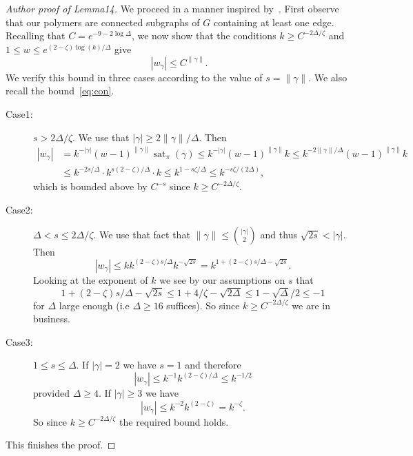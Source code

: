 \documentclass[10pt,a4paper]{article}
\theoremstyle{definition}
\DeclareMathOperator{\sat}{sat}
\begin{document}
\begin{proof}[Author proof of Lemma14]
We proceed in a manner inspired by~\cite[Theorem2.4]{BCHPT19}. First observe that our polymers are connected subgraphs of $G$ containing at least one edge. Recalling that $C=e^{-9-2\log\Delta}$, we now show that the conditions $k\geq C^{-2\Delta/\zeta}$ and $1\leq w\leq e^{(2-\zeta)\log(k)/\Delta}$ give
\begin{equation}|w_\gamma|\leq C^{\|\gamma\|}.\label{eq:weight bound}\end{equation}
We verify this bound in three cases according to the value of $s=\|\gamma\|$. We also recall the bound~\eqref{eq:con}.
\begin{description}
\item[Case1:] $s>2\Delta/\zeta$. We use that $|\gamma|\geq2\|\gamma\|/\Delta$. Then
\begin{align*}|w_\gamma|&=k^{-|\gamma|}(w-1)^{\|\gamma\|}\sat_\pi(\gamma)\leq k^{-|\gamma|}(w-1)^{\|\gamma\|}k\leq k^{-2\|\gamma\|/\Delta}(w-1)^{\|\gamma\|}k\\&\leq k^{-2s/\Delta}\cdot k^{s(2-\zeta)/\Delta}\cdot k\leq k^{1-s\zeta/\Delta}\leq k^{-s\zeta/(2\Delta)},\end{align*}
which is bounded above by $C^{-s}$ since $k\geq C^{-2\Delta/\zeta}$.
\item[Case2:] $\Delta<s\leq2\Delta/\zeta$. We use that fact that $\|\gamma\|\leq\binom{|\gamma|}2$ and thus $\sqrt{2s}<|\gamma|$. Then
\[|w_\gamma|\leq kk^{(2-\zeta)s/\Delta}k^{-\sqrt{2s}}=k^{1+(2-\zeta)s/\Delta-\sqrt{2s}}.\]
Looking at the exponent of $k$ we see by our assumptions on $s$ that
\[1+(2-\zeta)s/\Delta-\sqrt{2s}\leq1+4/\zeta-\sqrt{2\Delta}\leq1-\sqrt\Delta/2\leq-1\]
for $\Delta$ large enough (i.e $\Delta\geq16$ suffices). So since $k\geq C^{-2\Delta/\zeta}$ we are in business.
\item[Case3:] $1\leq s\leq\Delta$. If $|\gamma|=2$ we have $s=1$ and therefore
\[|w_\gamma|\leq k^{-1}k^{(2-\zeta)/\Delta}\leq k^{-1/2}\]
provided $\Delta\geq4$. If $|\gamma|\geq3$ we have
\[|w_\gamma|\leq k^{-2}k^{(2-\zeta)}=k^{-\zeta}.\]
So since $k\geq C^{-2\Delta/\zeta}$ the required bound holds.
\end{description}
This finishes the proof.
\end{proof}
\end{document}
